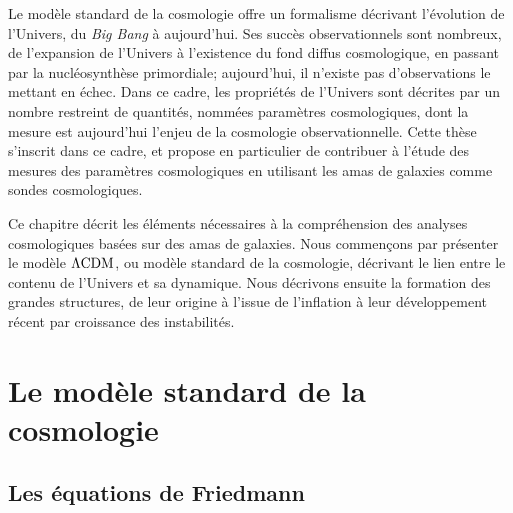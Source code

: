 Le modèle standard de la cosmologie offre un formalisme décrivant l'évolution de l'Univers, du \textit{Big Bang} à aujourd'hui.
Ses succès observationnels sont nombreux, de l'expansion de l'Univers à l'existence du fond diffus cosmologique, en passant par la nucléosynthèse primordiale; aujourd'hui, il n'existe pas d'observations le mettant en échec.
Dans ce cadre, les propriétés de l'Univers sont décrites par un nombre restreint de quantités, nommées paramètres cosmologiques, dont la mesure est aujourd'hui l'enjeu de la cosmologie observationnelle.
Cette thèse s'inscrit dans ce cadre, et propose en particulier de contribuer à l'étude des mesures des paramètres cosmologiques en utilisant les amas de galaxies comme sondes cosmologiques.

Ce chapitre décrit les éléments nécessaires à la compréhension des analyses cosmologiques basées sur des amas de galaxies.
Nous commençons par présenter le modèle $\Lambda {\rm CDM}$, ou modèle standard de la cosmologie, décrivant le lien entre le contenu de l'Univers et sa dynamique.
Nous décrivons ensuite la formation des grandes structures, de leur origine à l'issue de l'inflation à leur développement récent par croissance des instabilités.

\section{Le modèle standard de la cosmologie}

\subsection{Les équations de Friedmann}\label{sec:friedmann}

